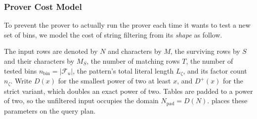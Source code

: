 \subsubsection{Prover Cost Model}
\label{sec:cost-model}
To prevent the prover to actually run the prover each time it wants to test a new set of bins, we model the cost of string filtering from its \emph{shape} as follow.

 The input rows are denoted by $N$ and characters by $M$, the surviving rows by $S$ and their characters by $M_S$, the number of matching rows $T$, the number of tested bins $n_{\mathrm{bin}} = |\mathcal{F}_u|$, the pattern's total literal length $L_\zeta$, and its factor count $n_\zeta$. Write $D(x)$ for the smallest power of two at least $x$, and $D^+(x)$ for the strict variant, which doubles an exact power of two. Tables are padded to a power of two, so the unfiltered input occupies the domain $N_{\mathrm{pad}} = D(N)$.  places these parameters on the query plan.

